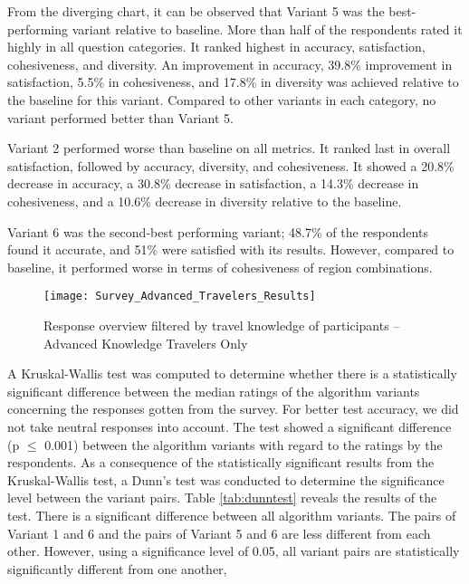 From the diverging chart, it can be observed that Variant 5 was the best-performing variant relative to baseline. More than half of the respondents rated it highly in all question categories. It ranked highest in accuracy, satisfaction, cohesiveness, and diversity. An improvement in accuracy, 39.8\% improvement in satisfaction, 5.5\% in cohesiveness, and 17.8\% in diversity was achieved relative to the baseline for this variant. Compared to other variants in each category, no variant performed better than Variant 5.

Variant 2 performed worse than baseline on all metrics. It ranked last in overall satisfaction, followed by accuracy, diversity, and cohesiveness. It showed a 20.8\% decrease in accuracy, a 30.8\% decrease in satisfaction, a 14.3\% decrease in cohesiveness, and a 10.6\% decrease in diversity relative to the baseline.

Variant 6 was the second-best performing variant; 48.7\% of the respondents found it accurate, and 51\% were satisfied with its results. However, compared to baseline, it performed worse in terms of cohesiveness of region combinations.

\begin{figure}[htpb]
    \centering
    \texttt{[image: Survey\_Advanced\_Travelers\_Results]}
    \caption{Response overview filtered by travel knowledge of participants – Advanced Knowledge Travelers Only}
    \label{fig:survey_advanced_travelers}
\end{figure}

A Kruskal-Wallis \parencite{Vargha1998TheHomogeneity} test was computed to determine whether there is a statistically significant difference between the median ratings of the algorithm variants concerning the responses gotten from the survey. For better test accuracy, we did not take neutral responses into account. The test showed a significant difference (p $\leq$ 0.001) between the algorithm variants with regard to the ratings by the respondents. As a consequence of the statistically significant results from the Kruskal-Wallis test, a Dunn's test was conducted to determine the significance level between the variant pairs. Table \ref{tab:dunntest} reveals the results of the test. There is a significant difference between all algorithm variants. The pairs of Variant 1 and 6 and the pairs of Variant 5 and 6 are less different from each other. However, using a significance level of 0.05, all variant pairs are statistically significantly different from one another,

